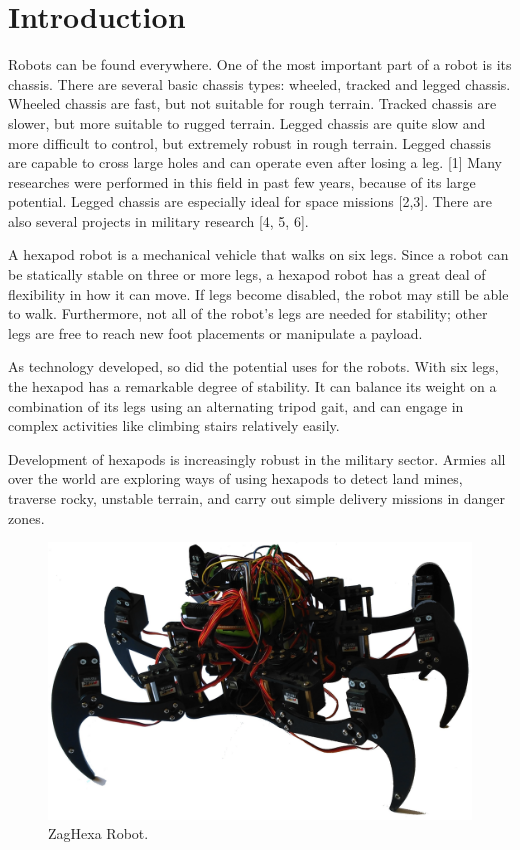 \documentclass[conference]{IEEEtran}
\begin{document}
\section{Introduction}
Robots can be found everywhere. One of the most
important part of a robot is its chassis. There are several
basic chassis types: wheeled, tracked and legged chassis. Wheeled chassis are fast, but not suitable for rough terrain. Tracked chassis are slower, but more suitable to rugged terrain. Legged chassis are quite slow and more difficult to control, but extremely robust in rough terrain. Legged chassis are capable to cross large holes and can operate even after losing a leg. [1] Many researches were performed in this
field in past few years, because of its large potential. Legged chassis are especially ideal for space missions [2,3]. There are also several projects in military research [4, 5, 6].

A hexapod robot is a mechanical vehicle that walks on six legs. Since a robot can be statically stable on three or more legs, a hexapod robot has a great deal of flexibility in how it can move. If legs become disabled, the robot may still be able to walk. Furthermore, not all of the robot's legs are needed for stability; other legs are free to reach new foot placements or manipulate a payload.

As technology developed, so did the potential uses for the robots. With six legs, the hexapod has a remarkable degree of stability. It can balance its weight on a combination of its legs using an alternating tripod gait, and can engage in complex activities like climbing stairs relatively easily.

Development of hexapods is increasingly robust in the military sector. Armies all over the world are exploring ways of using hexapods to detect land mines, traverse rocky, unstable terrain, and carry out simple delivery missions in danger zones.
\begin{figure}
    \centering
    \includegraphics[width=0.95\linewidth]{figures/ZagHexa}
    \caption{ZagHexa Robot.}
    \label{fig:zaghexa}
\end{figure}
\end{document}
